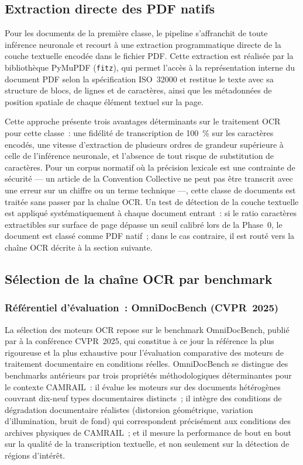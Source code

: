 \documentclass[12pt,a4paper]{report}
\begin{document}
\subsection{Extraction directe des PDF natifs}

Pour les documents de la première classe, le pipeline s'affranchit de toute inférence neuronale
et recourt à une extraction programmatique directe de la couche textuelle encodée dans le fichier
PDF. Cette extraction est réalisée par la bibliothèque PyMuPDF (\texttt{fitz}), qui permet
l'accès à la représentation interne du document PDF selon la spécification ISO~32000 et restitue
le texte avec sa structure de blocs, de lignes et de caractères, ainsi que les métadonnées de
position spatiale de chaque élément textuel sur la page.

Cette approche présente trois avantages déterminants sur le traitement OCR pour cette classe~: une
fidélité de transcription de 100~\% sur les caractères encodés, une vitesse d'extraction de
plusieurs ordres de grandeur supérieure à celle de l'inférence neuronale, et l'absence de tout
risque de substitution de caractères. Pour un corpus normatif où la précision lexicale est une
contrainte de sécurité --- un article de la Convention Collective ne peut pas être transcrit avec
une erreur sur un chiffre ou un terme technique ---, cette classe de documents est traitée sans
passer par la chaîne OCR. Un test de détection de la couche textuelle est appliqué
systématiquement à chaque document entrant~: si le ratio caractères extractibles sur surface de
page dépasse un seuil calibré lors de la Phase~0, le document est classé comme PDF natif~; dans
le cas contraire, il est routé vers la chaîne OCR décrite à la section suivante.

\subsection{Sélection de la chaîne OCR par benchmark}

\subsubsection*{Référentiel d'évaluation~: OmniDocBench (CVPR~2025)}

La sélection des moteurs OCR repose sur le benchmark OmniDocBench, publié par \textcite{Shi2024}
à la conférence CVPR~2025, qui constitue à ce jour la référence la plus rigoureuse et la plus
exhaustive pour l'évaluation comparative des moteurs de traitement documentaire en conditions
réelles. OmniDocBench se distingue des benchmarks antérieurs par trois propriétés
méthodologiques déterminantes pour le contexte CAMRAIL~: il évalue les moteurs sur des documents
hétérogènes couvrant dix-neuf types documentaires distincts~; il intègre des conditions de
dégradation documentaire réalistes (distorsion géométrique, variation d'illumination, bruit de
fond) qui correspondent précisément aux conditions des archives physiques de CAMRAIL~; et il
mesure la performance de bout en bout sur la qualité de la transcription textuelle, et non
seulement sur la détection de régions d'intérêt.
\end{document}
